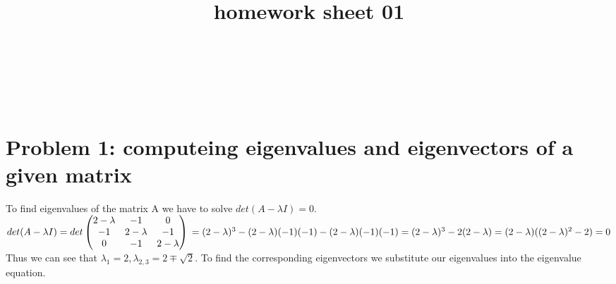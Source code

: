 \documentclass{article}
\title{homework sheet 01}
\author{
	\name{Denys Sobchyshak}\\
	\imat{03636581}\\
	\email{denys.sobchyshak@gmail.com}
	\And
	\name{Serge Zakharov} \\
	\imat{03636642}\\
	\email{zsn2008@gmail.com}
}
\begin{document}
	\maketitle
	
	\section{Problem 1: computeing eigenvalues and eigenvectors of a given matrix}
	To find eigenvalues of the matrix A we have to solve $ det(A-\lambda I)=0 $. \\
	$
	det(A-\lambda I)= det
	\begin{pmatrix} 
		2-\lambda & -1 & 0  \\ 
		-1 & 2-\lambda & -1 \\ 
		0 & -1 & 2-\lambda
	\end{pmatrix}\\
	=(2-\lambda)^3-(2-\lambda)(-1)(-1)-(2-\lambda)(-1)(-1)\\
	=(2-\lambda)^3-2(2-\lambda)=(2-\lambda)((2-\lambda)^2-2)=0
	$\\
	Thus we can see that $\lambda_1=2, \lambda_{2,3}=2\mp\sqrt{2}$. To find the corresponding eigenvectors we substitute our eigenvalues into the eigenvalue equation.\\
\end{document}
